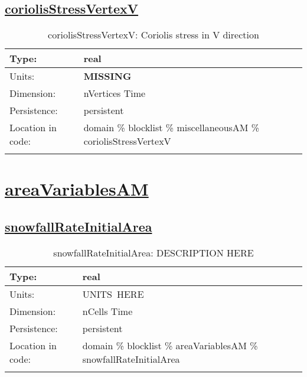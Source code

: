 \subsection[coriolisStressVertexV]{\hyperref[sec:var_tab_miscellaneousAM]{coriolisStressVertexV}}
\label{subsec:var_sec_miscellaneousAM_coriolisStressVertexV}
\begin{center}
\begin{longtable}{| p{2.0in} | p{4.0in} |}
        \hline 
        Type: & real \\
        \hline 
        Units: & {\bf \color{red} MISSING} \\
        \hline 
        Dimension: & nVertices Time \\
        \hline 
        Persistence: & persistent \\
        \hline 
         Location in code: & domain \% blocklist \% miscellaneousAM \% coriolisStressVertexV \\
         \hline 
    \caption{coriolisStressVertexV: Coriolis stress in V direction}
\end{longtable}
\end{center}
\section[areaVariablesAM]{\hyperref[sec:var_tab_areaVariablesAM]{areaVariablesAM}}
\label{sec:var_sec_areaVariablesAM}
\subsection[snowfallRateInitialArea]{\hyperref[sec:var_tab_areaVariablesAM]{snowfallRateInitialArea}}
\label{subsec:var_sec_areaVariablesAM_snowfallRateInitialArea}
\begin{center}
\begin{longtable}{| p{2.0in} | p{4.0in} |}
        \hline 
        Type: & real \\
        \hline 
        Units: & \si{UNITS.HERE} \\
        \hline 
        Dimension: & nCells Time \\
        \hline 
        Persistence: & persistent \\
        \hline 
         Location in code: & domain \% blocklist \% areaVariablesAM \% snowfallRateInitialArea \\
         \hline 
    \caption{snowfallRateInitialArea: DESCRIPTION HERE}
\end{longtable}
\end{center}
